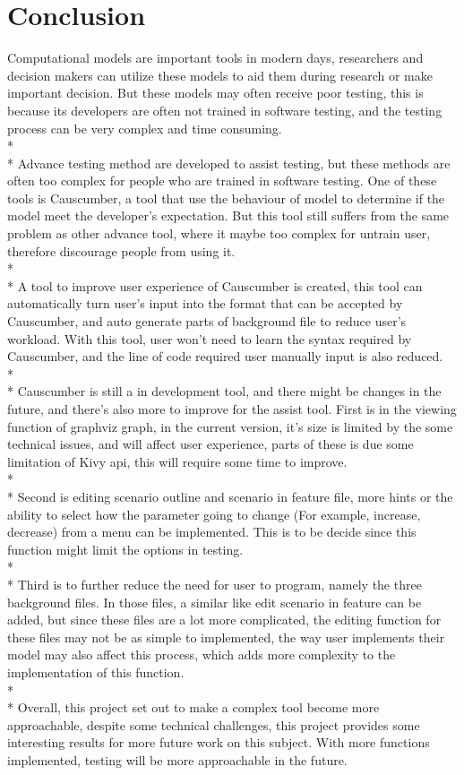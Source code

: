 \chapter{Conclusion}
Computational models are important tools in modern days, researchers and decision makers can utilize these models to aid them during research or make important decision. But these models may often receive poor testing, this is because its developers are often not trained in software testing, and the testing process can be very complex and time consuming. \\*\\*
Advance testing method are developed to assist testing, but these methods are often too complex for people who are trained in software testing. One of these tools is Causcumber, a tool that use the behaviour of model to determine if the model meet the developer’s expectation. But this tool still suffers from the same problem as other advance tool, where it maybe too complex for untrain user, therefore discourage people from using it. \\*\\*
A tool to improve user experience of Causcumber is created, this tool can automatically turn user’s input into the format that can be accepted by Causcumber, and auto generate parts of background file to reduce user’s workload. With this tool, user won’t need to learn the syntax required by Causcumber, and the line of code required user manually input is also reduced.\\*\\*
Causcumber is still a in development tool, and there might be changes in the future, and there’s also more to improve for the assist tool. First is in the viewing function of graphviz graph, in the current version, it’s size is limited by the some technical issues, and will affect user experience, parts of these is due some limitation of Kivy api, this will require some time to improve. \\*\\*
Second is editing scenario outline and scenario in feature file, more hints or the ability to select how the parameter going to change (For example, increase, decrease) from a menu can be implemented. This is to be decide since this function might limit the options in testing. \\*\\*
Third is to further reduce the need for user to program, namely the three background files. In those files, a similar like edit scenario in feature can be added, but since these files are a lot more complicated, the editing function for these files may not be as simple to implemented, the way user implements their model may also affect this process, which adds more complexity to the implementation of this function.\\*\\* 
Overall, this project set out to make a complex tool become more approachable, despite some technical challenges, this project provides some interesting results for more future work on this subject. With more functions implemented, testing will be more approachable in the future.

